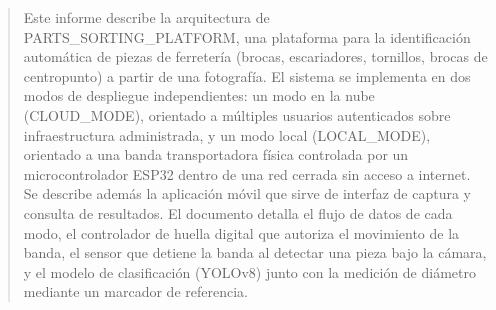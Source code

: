 \begin{abstract}
Este informe describe la arquitectura de PARTS\_SORTING\_PLATFORM, una
plataforma para la identificación automática de piezas de ferretería
(brocas, escariadores, tornillos, brocas de centropunto) a partir de
una fotografía. El sistema se implementa en dos modos de despliegue
independientes: un modo en la nube (CLOUD\_MODE), orientado a múltiples
usuarios autenticados sobre infraestructura administrada, y un modo
local (LOCAL\_MODE), orientado a una banda transportadora física
controlada por un microcontrolador ESP32 dentro de una red cerrada sin
acceso a internet. Se describe además la aplicación móvil que sirve de
interfaz de captura y consulta de resultados. El documento detalla el
flujo de datos de cada modo, el controlador de huella digital que
autoriza el movimiento de la banda, el sensor que detiene la banda al
detectar una pieza bajo la cámara, y el modelo de clasificación
(YOLOv8) junto con la medición de diámetro mediante un marcador de
referencia.
\end{abstract}
